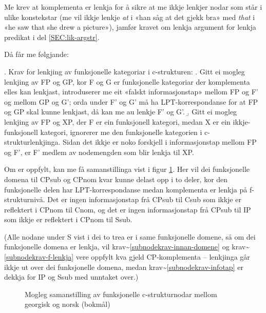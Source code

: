 \documentclass[11pt,a4paper,oneside,draft]{book}
\begin{document}
Me krev at komplementa er lenkja for å sikre at me ikkje lenkjer nodar
som står i ulike konstekstar (me vil ikkje lenkje \emph{at} i «han såg at
det gjekk bra» med \emph{that} i «he saw that she drew a picture»), jamfør
kravet om lenkja argument for lenkja predikat i del
\ref{SEC:lik-argstr}.

Då får me følgjande:

\ex. \label{fnordkrav} Krav for lenkjing av funksjonelle kategoriar i c-strukturen:
\a. Gitt ei mogleg lenkjing av FP og GP, kor F og G er funksjonelle
    kategoriar der komplementa elles kan lenkjast, introduserer me eit
    «falskt informasjonstap» mellom FP og F' og mellom GP og G'; orda
    under F' og G' må ha LPT-korrespondanse for at FP og GP skal kunne
    lenkjast, då kan me au lenkje F' og G'.  
\b. Gitt ei mogleg lenkjing av FP og XP, der F er ein funksjonell
    kategori, medan X er ein ikkje-funksjonell kategori, ignorerer me
    den funksjonelle kategorien i c-strukturlenkjinga. Sidan det ikkje
    er noko forskjell i informasjonstap mellom FP og F', er F' medlem
    av nodemengden som blir lenkja til XP.


Om \Last[a] er oppfylt, kan me få samanstillinga vist i figur
\ref{fig:fnord}. Her vil dei funksjonelle domena til CPsub og CPnom
kvar kunne delast opp i to deler, kor den funksjonelle delen har
LPT-korrespondanse medan komplementa er lenkja på f-strukturnivå. Det
er ingen informasjonstap frå CPsub til Csub som ikkje er reflektert i
CPnom til Cnom, og det er ingen informasjonstap frå CPsub til IP som
ikkje er reflektert i CPnom til Ssub.

(Alle nodane under S vist i dei to trea er i same funksjonelle domene,
så om dei funksjonelle domena er lenkja, vil
krav\~{}\ref{subnodekrav-innan-domene} og krav\~{}\ref{subnodekrav-f-lenkja}
vere oppfylt kva gjeld CP-komplementa -- lenkjinga går ikkje ut over
dei funksjonelle domena, medan krav\~{}\ref{subnodekrav-infotap} er
dekkja for IP og Ssub med unntaket over.)

  \begin{figure}[htp]
   \centering
  
  \caption{Mogleg samanstilling av funksjonelle c-strukturnodar mellom georgisk og norsk (bokmål)}
   \label{fig:fnord}
  \end{figure}
\end{document}
